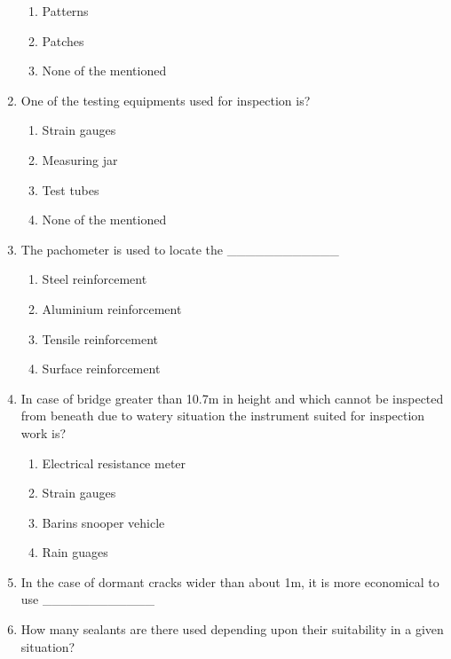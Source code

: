 \documentclass[11pt,a4paper]{article}
\begin{document}
\begin{enumerate}
\begin{enumerate}[label=\Alph*.]
\item{Patterns }
\item{Patches}
\item{None of the mentioned}
\end{enumerate}
\item{One of the testing equipments used for inspection is?}
\begin{enumerate}[label=\Alph*.]
\item{Strain gauges}
\item{Measuring jar}
\item{Test tubes}
\item{None of the mentioned}
\end{enumerate}
\item{The pachometer is used to locate the \_\_\_\_\_\_\_\_\_\_\_\_}
\begin{enumerate}[label=\Alph*.]
\item{Steel reinforcement}
\item{Aluminium reinforcement}
\item{Tensile reinforcement}
\item{Surface reinforcement}
\end{enumerate}
\item{In case of bridge greater than 10.7m in height and which cannot be inspected from beneath due to watery situation the instrument suited for inspection work is?}
\begin{enumerate}[label=\Alph*.]
\item{Electrical resistance meter}
\item{Strain gauges}
\item{Barins snooper vehicle}
\item{Rain guages}
\end{enumerate}
\item{In the case of dormant cracks wider than about 1m, it is more economical to use \_\_\_\_\_\_\_\_\_\_\_\_}
\\
\item{How many sealants are there used depending upon their suitability in a given situation?}
\\\begin{enumerate*}[itemjoin=\qquad, label=\Alph*.]

\end{enumerate*}
\end{enumerate}
\end{document}
